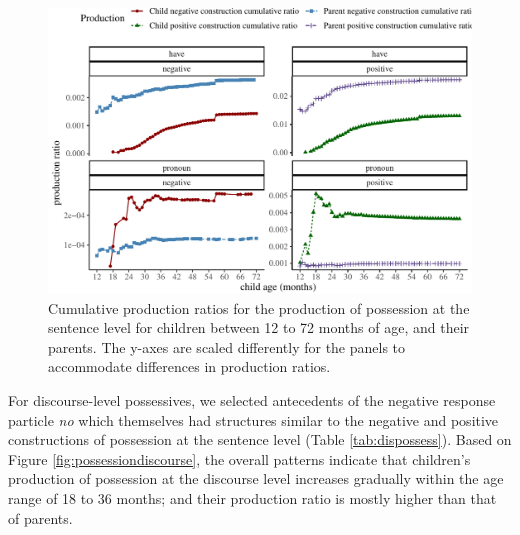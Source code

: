 \documentclass[
  man,floatsintext]{apa6}
\begin{document}
\begin{figure}[H]

{\centering \includegraphics{neg_construction_article_files/figure-latex/possession-1} 

}

\caption{Cumulative production ratios for the production of possession at the sentence level for children between 12 to 72 months of age, and their parents. The y-axes are scaled differently for the panels to accommodate differences in production ratios.}\label{fig:possession}
\end{figure}

For discourse-level possessives, we selected antecedents of the negative response particle \emph{no} which themselves had structures similar to the negative and positive constructions of possession at the sentence level (Table \ref{tab:dispossess}). Based on Figure \ref{fig:possessiondiscourse}, the overall patterns indicate that children's production of possession at the discourse level increases gradually within the age range of 18 to 36 months; and their production ratio is mostly higher than that of parents.
\end{document}
